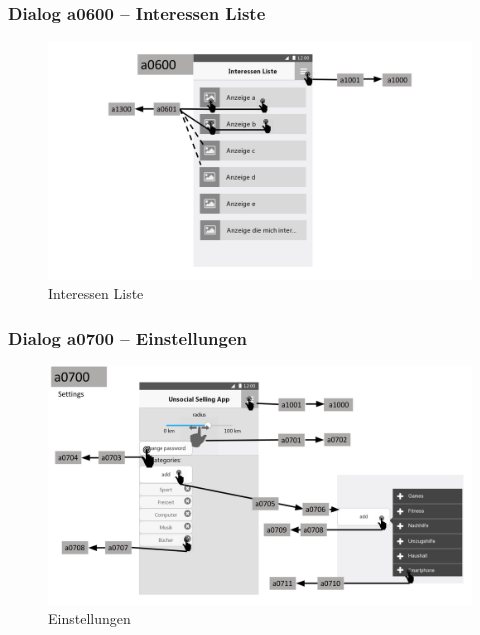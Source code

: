 \documentclass[a4paper,12pt,oneside]{scrartcl}
\begin{document}
\subsubsection{Dialog a0600 – Interessen Liste}
\begin{figure}[!htbp]
\centering
\noindent\includegraphics[width=\linewidth,height=\textheight,keepaspectratio]{Dialoge/a0600}
\caption{Interessen Liste}
\end{figure}
\FloatBarrier

\subsubsection{Dialog a0700 – Einstellungen}
\begin{figure}[!htbp]
\centering
\noindent\includegraphics[width=\linewidth,height=\textheight,keepaspectratio]{Dialoge/a0700}
\caption{Einstellungen}
\end{figure}
\FloatBarrier
\end{document}
